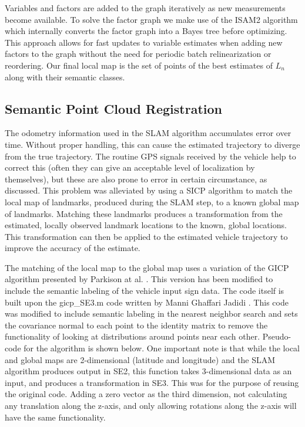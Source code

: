 \documentclass[letterpaper, 10 pt, conference]{ieeeconf}  %
\begin{document}
Variables and factors are added to the graph iteratively as new measurements become available.
To solve the factor graph we make use of the ISAM2 algorithm \cite{ref:isam} which internally converts the factor graph into a Bayes tree before optimizing. This approach allows for fast updates to variable estimates when adding new factors to the graph without the need for periodic batch relinearization or reordering.
Our final local map is the set of points of the best estimates of $L_n$ along with their semantic classes.

\subsection{Semantic Point Cloud Registration}
The odometry information used in the SLAM algorithm accumulates error over time. Without proper handling, this can cause the estimated trajectory to diverge from the true trajectory. The routine GPS signals received by the vehicle help to correct this (often they can give an acceptable level of localization by themselves), but these are also prone to error in certain circumstance, as discussed. This problem was alleviated by using a SICP algorithm to match the local map of landmarks, produced during the SLAM step, to a known global map of landmarks. Matching these landmarks produces a transformation from the estimated, locally observed landmark locations to the known, global locations. This transformation can then be applied to the estimated vehicle trajectory to improve the accuracy of the estimate. 

The matching of the local map to the global map uses a variation of the GICP algorithm presented by Parkison at al. \cite{cGICP}. This version has been modified to include the semantic labeling of the vehicle input sign data. The code itself is built upon the gicp\_SE3.m code written by Manni Ghaffari Jadidi \cite{cgicpse3}. This code was modified to include semantic labeling in the nearest neighbor search and sets the covariance normal to each point to the identity matrix to remove the functionality of looking at distributions around points near each other. Pseudo-code for the algorithm is shown below. One important note is that while the local and global maps are 2-dimensional (latitude and longitude) and the SLAM algorithm produces output in SE2, this function takes 3-dimensional data as an input, and produces a transformation in SE3. This was for the purpose of reusing the original code. Adding a zero vector as the third dimension, not calculating any translation along the z-axis, and only allowing rotations along the z-axis will have the same functionality.
\end{document}
